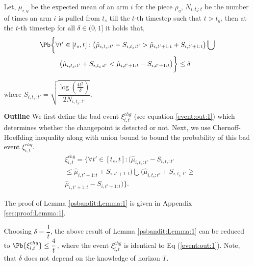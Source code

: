 \begin{customlemma}{2}
\label{psbandit:Lemma:1}
Let, $\mu_{i,g}$ be the expected mean of an arm $i$ for the piece $\rho_{g}$, $N_{i,t_s:t}$ be the number of times an arm $i$ is pulled from $t_s$ till the $t$-th timestep such that $t>t_{g}$, then at the $t$-th timestep for all $\delta\in (0,1]$  it holds that,
\begin{align*}
\Pb\bigg\lbrace\forall & t'\in [t_s , t]: \big(\hat{\mu}_{i,t_s:t'} - S_{i,t_s:t'} > \hat{\mu}_{i,t'+1:t} + S_{i,t'+1:t}\big) \bigcup\\
 &\big(\hat{\mu}_{i,t_s:t'} +  S_{i,t_s:t'} < \hat{\mu}_{i,t'+1:t} - S_{i,t'+1:t} \big)\bigg\rbrace \leq \delta
\end{align*}

where $S_{i,t_s:t'} = \sqrt{\dfrac{\log(\frac{4t^2}{\delta})}{2N_{i,t_s:t'}}}$.

\end{customlemma}

\begin{customproof}{2} \textbf{Outline} We first define the bad event $\xi^{chg}_{i,t}$ (see equation \ref{event:out:1}) which determines whether the changepoint is detected or not. Next, we use Chernoff-Hoeffding inequality along with union bound to bound the probability of this bad event $\xi^{chg}_{i,t}$.
\begin{eqnarray}
&\xi^{chg}_{i,t} = \bigg\lbrace\forall t'\in [t_s , t]: \big(\hat{\mu}_{i,t_s:t'} - S_{i,t_s:t'}  \nonumber\\ 
&\leq \hat{\mu}_{i,t'+1:t} + S_{i,t'+1:t}\big) \bigcup \big(\hat{\mu}_{i,t_s:t'} +  S_{i,t_s:t'} \geq  \nonumber\\
 & \hat{\mu}_{i,t'+1:t} - S_{i,t'+1:t}\big)\bigg\rbrace. \label{event:out:1}
\end{eqnarray}

The proof of Lemma \ref{psbandit:Lemma:1} is given in Appendix \ref{sec:proof:Lemma:1}.
\end{customproof}

\begin{remark}
\label{Rem:1}
Choosing $\delta=\dfrac{1}{t}$, the above result of Lemma \ref{psbandit:Lemma:1} can be reduced to $\Pb\lbrace \xi^{chg}_{i,t}\rbrace \leq \dfrac{4}{t}$, where the event $\xi^{chg}_{i,t}$ is identical to Eq (\ref{event:out:1}). Note, that $\delta$ does not depend on the knowledge of horizon $T$.
\end{remark}


